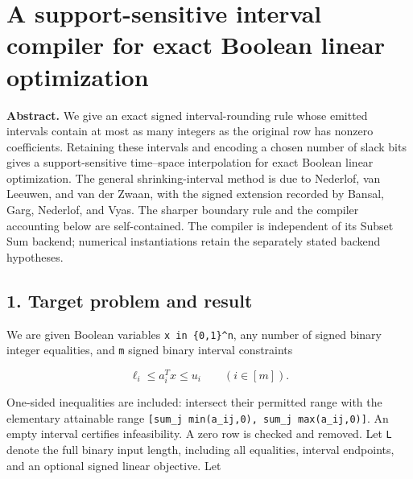 
\hypertarget{af-77b0bb6793-a-support-sensitive-interval-compiler-for-exact-boolean-linear-optimization}{%
\section{A support-sensitive interval compiler for exact Boolean linear optimization}\label{af-77b0bb6793-a-support-sensitive-interval-compiler-for-exact-boolean-linear-optimization}}

\textbf{Abstract.} We give an exact signed interval-rounding rule whose emitted intervals contain at most as many integers as the original row has nonzero coefficients. Retaining these intervals and encoding a chosen number of slack bits gives a support-sensitive time--space interpolation for exact Boolean linear optimization. The general shrinking-interval method is due to Nederlof, van Leeuwen, and van der Zwaan, with the signed extension recorded by Bansal, Garg, Nederlof, and Vyas. The sharper boundary rule and the compiler accounting below are self-contained. The compiler is independent of its Subset Sum backend; numerical instantiations retain the separately stated backend hypotheses.

\hypertarget{af-77b0bb6793-target-problem-and-result}{%
\subsection{1. Target problem and result}\label{af-77b0bb6793-target-problem-and-result}}

We are given Boolean variables \texttt{x\ in\ \{0,1\}\^{}n}, any number of signed binary integer equalities, and \texttt{m} signed binary interval constraints

\[
\ell_i\le a_i^T x\le u_i\qquad(i\in[m]).
\]

One-sided inequalities are included: intersect their permitted range with the elementary attainable range \texttt{{[}sum\_j\ min(a\_ij,0),\ sum\_j\ max(a\_ij,0){]}}. An empty interval certifies infeasibility. A zero row is checked and removed. Let \texttt{L} denote the full binary input length, including all equalities, interval endpoints, and an optional signed linear objective. Let

